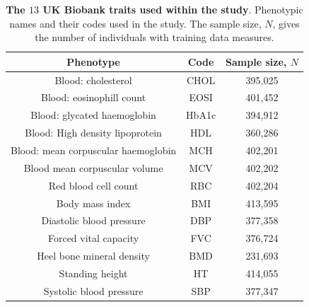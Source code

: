 \begin{table}[!htp]
\caption[The $13$ UK Biobank traits used within the study]{\textbf{The $13$ UK Biobank traits used within the study}. \small Phenotypic names and their
codes used in the study. The sample size, $N$, gives the number of individuals with training data measures.}
\begin{center}
\begin{tabular}{|| c | c | c ||} 
 \hline
Phenotype & Code & Sample size, $N$ \\ [0.5ex] 
 \hline\hline
Blood: cholesterol & CHOL & 395,025  \\
 \hline 
Blood: eosinophill count & EOSI & 401,452  \\
 \hline 
Blood: glycated haemoglobin & HbA1c & 394,912  \\
 \hline
Blood: High density lipoprotein & HDL & 360,286  \\
 \hline
Blood: mean corpuscular haemoglobin & MCH & 402,201  \\
 \hline
Blood mean corpuscular volume & MCV & 402,202  \\
 \hline
Red blood cell count & RBC & 402,204  \\
 \hline
Body mass index & BMI & 413,595  \\
 \hline
Diastolic blood pressure & DBP & 377,358   \\
 \hline
Forced vital capacity & FVC & 376,724  \\
 \hline 
Heel bone mineral density & BMD & 231,693  \\
 \hline
Standing height  & HT & 414,055   \\
 \hline
Systolic blood pressure & SBP & 377,347  \\
\hline\hline
\end{tabular}
\end{center}
\label{table:tableS2}
\end{table}

\newpage


